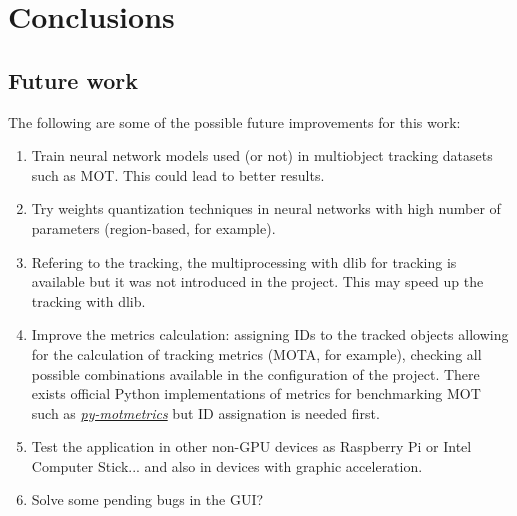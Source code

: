 \chapter{Conclusions}
\section{Future work}
The following are some of the possible future improvements for this work:
\begin{enumerate}
    \item Train neural network models used (or not) in multiobject tracking datasets such as MOT. This could lead to better results.
    \item Try weights quantization techniques in neural networks with high number of parameters (region-based, for example).
    \item Refering to the tracking, the multiprocessing with dlib for tracking is available but it was not introduced in the project. This may speed up the tracking with dlib.
    \item Improve the metrics calculation: assigning IDs to the tracked objects allowing for the calculation of tracking metrics (MOTA, for example), checking all possible combinations available in the configuration of the project. There exists official Python implementations of metrics for benchmarking MOT such as \href{https://github.com/cheind/py-motmetrics}{\textit{py-motmetrics}} but ID assignation is needed first.
    \item Test the application in other non-GPU devices as Raspberry Pi or Intel Computer Stick... and also in devices with graphic acceleration.
    \item Solve some pending bugs in the GUI?
\end{enumerate}